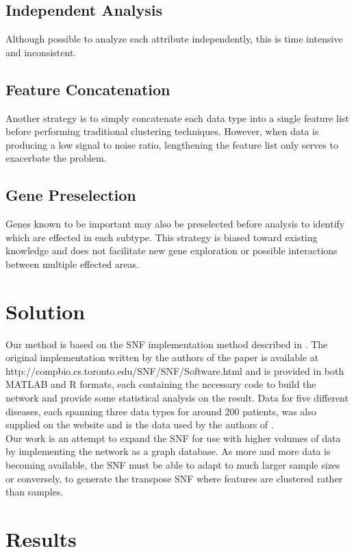 \documentclass[12pt]{article}
\begin{document}
\subsection*{Independent Analysis}
\quad Although possible to analyze each attribute independently, this is time intensive and inconsistent.
\subsection*{Feature Concatenation}
\quad Another strategy is to simply concatenate each data type into a single feature list before performing traditional clustering techniques. However, when data is producing a low signal to noise ratio, lengthening the feature list only serves to exacerbate the problem. 
\subsection*{Gene Preselection}
\quad Genes known to be important may also be preselected before analysis to identify which are effected in each subtype. This strategy is biased toward existing knowledge and does not facilitate new gene exploration or possible interactions between multiple effected areas.

\section*{Solution}
\quad Our method is based on the SNF implementation method described in \cite{snf-nat}. The original implementation written by the authors of the paper is available at http://compbio.cs.toronto.edu/SNF/SNF/Software.html and is provided in both MATLAB and R formats, each containing the necessary code to build the network and provide some statistical analysis on the result. Data for five different diseases, each spanning three data types for around 200 patients, was also supplied on the website and is the data used by the authors of \cite{snf-nat}.\\
\quad Our work is an attempt to expand the SNF for use with higher volumes of data by implementing the network as a graph database. As more and more data is becoming available, the SNF must be able to adapt to much larger sample sizes or conversely, to generate the transpose SNF where features are clustered rather than samples.\\

\section*{Results}
\end{document}
